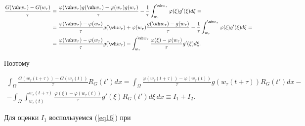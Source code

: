 \begin{align*}


\frac{G(\wh w_{\tau})-G(w_{\tau})}{\tau} &=


\frac{\varphi (\wh w_{\tau}) g(\wh w_{\tau}) -


\varphi (w_{\tau}) g(w_{\tau})}{\tau} -


\frac{1}{\tau} \int_{w_{\tau}}^{\wh w_{\tau}} \varphi


(\xi) g'(\xi) d \xi = \\


%


&= \frac{\varphi (\wh w_{\tau}) - \varphi (w_{\tau})}


{\tau} g(\wh w_{\tau}) + \varphi (w_{\tau}) \frac{g(\wh w_{\tau})-


g(w_{\tau})}{\tau} -


\frac{1}{\tau} \int_{w_{\tau}}^{\wh w_{\tau}}


\varphi (\xi) g'(\xi) d \xi = \\


%


&= \frac{\varphi (\wh w_{\tau}) - \varphi (w_{\tau})}


{\tau} g(\wh w_{\tau}) - \int_{w_{\tau}}^{\wh w_{\tau}}


\frac{\varphi(\xi) - \varphi(w_{\tau})}{\tau} g'(\xi) d \xi.


\end{align*}


Поэтому


\begin{multline}


\label{eq31}


\int_{\Omega} 


\frac{G(w_{\tau}(t+\tau))-G(w_{\tau}(t))}{\tau} R_{G}(t') dx =


\int_{\Omega} \frac{\varphi (w_{\tau}(t+\tau))


- \varphi (w_{\tau}(t))}{\tau} g(w_{\tau}(t+\tau)) R_{G}(t') dx - \\


%


- \int_{\Omega}


\int_{w_{\tau}(t)}^{w_{\tau}(t+\tau)}


\frac{\varphi(\xi) - \varphi(w_{\tau}(t))}{\tau} g'(\xi) R_{G}(t') 


d \xi\, dx \equiv I_{1} + I_{2}.


\end{multline}


Для оценки $I_{1}$ воспользуемся (\ref{eq16}) при


